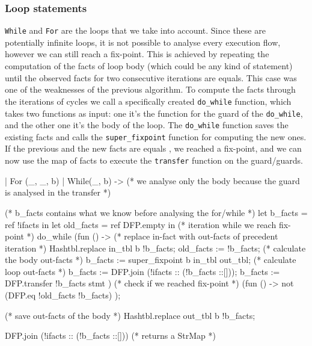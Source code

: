 \documentclass[a4paper]{article}   %
\begin{document}
\subsubsection{Loop statements}
\texttt{While} and \texttt{For} are the loops that we take into account. Since these are potentially infinite loops, it is not possible to analyse every execution flow, however we can still reach a fix-point. This is achieved by repeating the computation of the facts of loop body (which could be any kind of statement) until the observed facts for two consecutive iterations are equals. This case was one of the weaknesses of the previous algorithm. To compute the facts through the iterations of cycles 
we call a specifically created \texttt{do\_while} function, which takes two functions as input:
%
one it's the function for the guard of the \texttt{do\_while}, and the other one 
it's the body of the loop. The \texttt{do\_while} function saves the existing facts and calls the \texttt{super\_fixpoint} function for computing the new ones. If the previous and the new facts are equals%
, we reached a fix-point, 
and we can now use the map of facts to execute
%
the \texttt{transfer} function on the guard/guards.%

\begin{ocaml}
| For (_, _, b)		
| While(_, b) ->
	(* we analyse only the body because the guard is analysed in the transfer *)
				
	(* b_facts contains what we know before analysing the for/while *)
	let b_facts = ref !ifacts in
	let old_facts = ref DFP.empty in
	(* iteration while we reach fix-point *)
	do_while (fun () -> 
		(* replace in-fact with out-facts of precedent iteration *)
		Hashtbl.replace in_tbl b !b_facts;
		old_facts := !b_facts;
		(* calculate the body out-facts *)
		b_facts := super_fixpoint b in_tbl out_tbl;
		(* calculate loop out-facts *)
		b_facts := DFP.join (!ifacts :: (!b_facts ::[]));
		b_facts := DFP.transfer !b_facts stmt )
		(* check if we reached fix-point *)
		(fun () -> not (DFP.eq !old_facts !b_facts) 
	);

	(* save out-facts of the body *)
  	Hashtbl.replace out_tbl b !b_facts;

  	DFP.join (!ifacts :: (!b_facts ::[]))	(* returns a StrMap *)
\end{ocaml}
\end{document}
